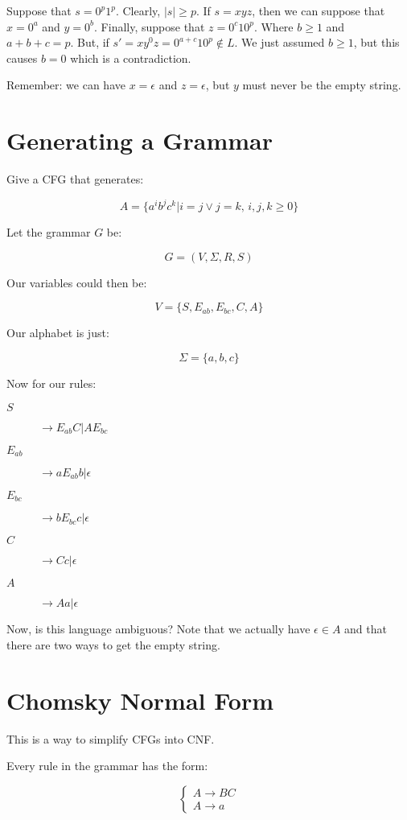 \documentclass{article}
\begin{document}
Suppose that $s=0^p1^p$. Clearly, $|s|\ge{}p$. If $s=xyz$, then we can
suppose that $x=0^a$ and $y=0^b$. Finally, suppose that
$z=0^c10^p$. Where $b\ge1$ and $a+b+c=p$. But, if
$s'=xy^0z=0^{a+c}10^p\not\in{}L$. We just assumed $b\ge1$, but this
causes $b=0$ which is a contradiction.

Remember: we can have $x=\epsilon$ and $z=\epsilon$, but $y$ must
never be the empty string.

\section*{Generating a Grammar}

Give a CFG that generates:

\[
A=\{a^ib^jc^k|i=j\vee{}j=k,\, i,j,k\ge0\}
\]

Let the grammar $G$ be:

\[
G=(V,\Sigma,R,S)
\]

Our variables could then be:

\[
V=\{S,E_{ab}, E_{bc}, C, A\}
\]

Our alphabet is just:

\[
\Sigma=\{a,b,c\}
\]

Now for our rules:

\begin{description}
\item[$S$]$\rightarrow{}E_{ab}C|AE_{bc}$
\item[$E_{ab}$]$\rightarrow{}aE_{ab}b|\epsilon$
\item[$E_{bc}$]$\rightarrow{}bE_{bc}c|\epsilon$
\item[$C$]$\rightarrow{}Cc|\epsilon$
\item[$A$]$\rightarrow{}Aa|\epsilon$
\end{description}

Now, is this language ambiguous? Note that we actually have
$\epsilon\in{}A$ and that there are two ways to get the empty string.

\section*{Chomsky Normal Form}

This is a way to simplify CFGs into CNF.

Every rule in the grammar has the form:

\[
\begin{cases}
A\rightarrow B C \\
A \rightarrow a
\end{cases}
\]
\end{document}
